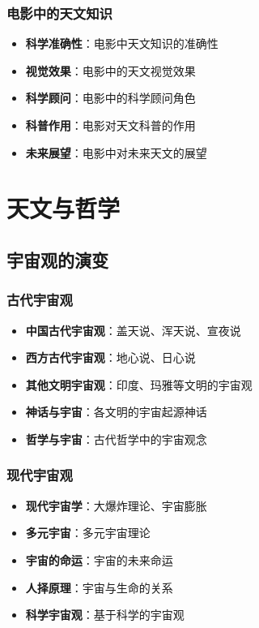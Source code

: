 \documentclass[12pt,UTF8]{ctexbook}
\begin{document}
\section{电影中的天文知识}

\begin{itemize}
  \item \textbf{科学准确性}：电影中天文知识的准确性
  \item \textbf{视觉效果}：电影中的天文视觉效果
  \item \textbf{科学顾问}：电影中的科学顾问角色
  \item \textbf{科普作用}：电影对天文科普的作用
  \item \textbf{未来展望}：电影中对未来天文的展望
\end{itemize}

\part{天文与哲学}

\chapter{宇宙观的演变}
\section{古代宇宙观}

\begin{itemize}
  \item \textbf{中国古代宇宙观}：盖天说、浑天说、宣夜说
  \item \textbf{西方古代宇宙观}：地心说、日心说
  \item \textbf{其他文明宇宙观}：印度、玛雅等文明的宇宙观
  \item \textbf{神话与宇宙}：各文明的宇宙起源神话
  \item \textbf{哲学与宇宙}：古代哲学中的宇宙观念
\end{itemize}

\section{现代宇宙观}

\begin{itemize}
  \item \textbf{现代宇宙学}：大爆炸理论、宇宙膨胀
  \item \textbf{多元宇宙}：多元宇宙理论
  \item \textbf{宇宙的命运}：宇宙的未来命运
  \item \textbf{人择原理}：宇宙与生命的关系
  \item \textbf{科学宇宙观}：基于科学的宇宙观
\end{itemize}
\end{document}
